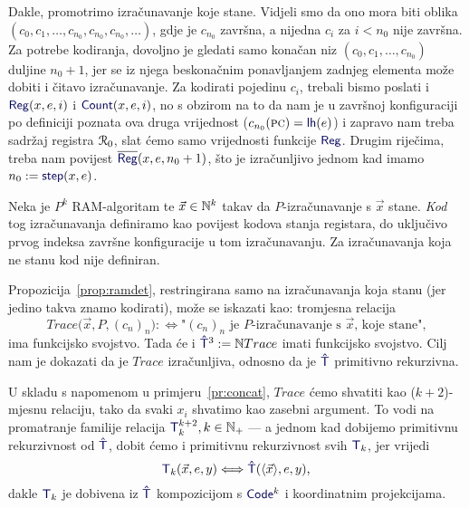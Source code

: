 Dakle, promotrimo izračunavanje koje stane. Vidjeli smo da ono mora biti oblika $(c_0,c_1,\dotsc,c_{n_0},c_{n_0},c_{n_0},\dotsc)$, gdje je $c_{n_0}$ završna, a nijedna $c_i$ za $i<n_0$ nije završna. Za potrebe kodiranja, dovoljno je gledati samo konačan niz $(c_0,c_1,\dotsc,c_{n_0})$ duljine $n_0+1$, jer se iz njega beskonačnim ponavljanjem zadnjeg elementa može dobiti i čitavo izračunavanje. Za kodirati pojedinu $c_i$, trebali bismo poslati i $\f{Reg}(x,e,i)$ i $\f{Count}(x,e,i)$, no s obzirom na to da nam je u završnoj konfiguraciji po definiciji poznata ova druga vrijednost ($c_{n_0}(\textsc{pc})=\f{lh}(e)$) i zapravo nam treba sadržaj registra $\mathcal R_{0}$, slat ćemo samo vrijednosti funkcije $\f{Reg}$. Drugim riječima, treba nam povijest $\overline{\f{Reg}}(x,e,n_0+1)$, što je izračunljivo jednom kad imamo $n_0:=\f{step}(x,e)$.

\begin{definicija}[{name=[kod izračunavanja]}]\label{def:kodizr}
Neka je $P^k$ RAM-algoritam te $\vec x\in{\mathbb N}^k$ takav da $P$-izračunavanje s $\vec x$ stane. \emph{Kod} tog izračunavanja definiramo kao povijest kodova stanja registara, do uključivo prvog indeksa završne konfiguracije u tom izračunavanju. Za izračunavanja koja ne stanu kod nije definiran.
\end{definicija}

Propozicija~\ref{prop:ramdet}, restringirana samo na izračunavanja koja stanu (jer jedino takva znamo kodirati), može se iskazati kao: tromjesna relacija \begin{equation}\label{eq:Trace}
    Trace\bigl(\vec x,P,(c_n)_n\bigr):\Longleftrightarrow\text{"$(c_n)_n$ je $P$-izračunavanje s $\vec x$, koje stane",}
\end{equation}
ima funkcijsko svojstvo. Tada će i $\f{\hat T}^3:=\N Trace$ imati funkcijsko svojstvo. Cilj nam je dokazati da je $Trace$ izračunljiva, odnosno da je $\f{\hat T}$ primitivno rekurzivna.

U skladu s napomenom u primjeru~\ref{pr:concat}, $Trace$ ćemo shvatiti kao ($k+2$)-mjesnu relaciju, tako da svaki $x_i$ shvatimo kao zasebni argument. To vodi na promatranje familije relacija $\f T_k^{k+2},k\in\N_+$ --- a jednom kad dobijemo primitivnu rekurzivnost od $\f{\hat T}$, dobit ćemo i primitivnu rekurzivnost svih $\f T_k$, jer vrijedi
\begin{equation}\label{eq:TkviadotT}
\f T_k(\vec x,e,y)\Longleftrightarrow\f{\hat T}(\langle\vec x\rangle,e,y)\text,
\end{equation}
dakle $\f T_k$ je dobivena iz $\f{\hat T}$ kompozicijom s $\f{Code}^k$ i koordinatnim projekcijama.

